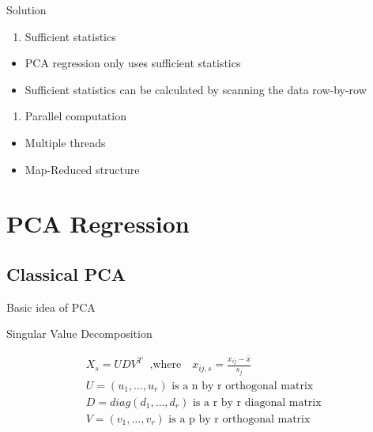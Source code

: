 \documentclass[ignorenonframetext,]{beamer}
\providecommand{\tightlist}{%
  \setlength{\itemsep}{0pt}\setlength{\parskip}{0pt}}
\begin{document}
\begin{frame}{Solution}

\begin{enumerate}
\def\labelenumi{\arabic{enumi}.}
\tightlist
\item
  Sufficient statistics
\end{enumerate}

\begin{itemize}
\tightlist
\item
  PCA regression only uses sufficient statistics
\item
  Sufficient statistics can be calculated by scanning the data
  row-by-row
\end{itemize}

\begin{enumerate}
\def\labelenumi{\arabic{enumi}.}
\setcounter{enumi}{1}
\tightlist
\item
  Parallel computation\\
\end{enumerate}

\begin{itemize}
\tightlist
\item
  Multiple threads
\item
  Map-Reduced structure
\end{itemize}

\end{frame}

\section{PCA Regression}\label{pca-regression}

\subsection{Classical PCA}\label{classical-pca}

\begin{frame}{Basic idea of PCA}

\begin{block}{Singular Value Decomposition}

\begin{gather*} 
  X_s = UDV^T \text{~~,where~~~} x_{ij,s} = \frac{x_{ij} - \bar{x}}{s_j} \\
  U = (u_1, \dots, u_r) \text {~is a n by r orthogonal matrix~} \\
  D = diag(d_1, \dots, d_r) \text {~is a r by r diagonal matrix~} \\
  V = (v_1, \dots, v_r) \text {~is a p by r orthogonal matrix~} \\
\end{gather*}

\end{block}

\end{frame}
\end{document}
